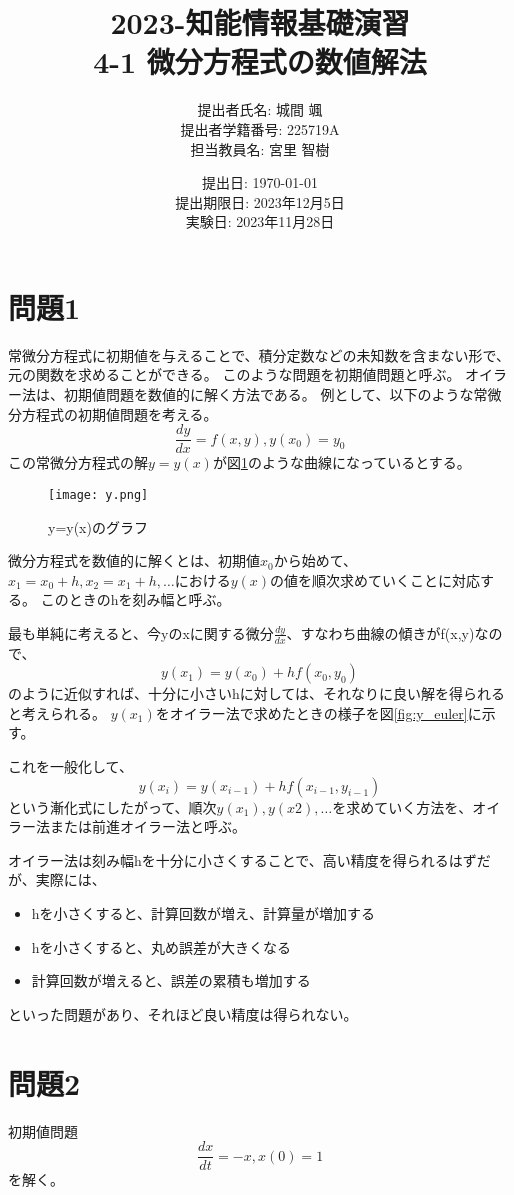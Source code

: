 \documentclass[a4paper, 11pt, titlepage]{jsarticle}
\title{2023-知能情報基礎演習\\4-1 微分方程式の数値解法}
\date{提出日: \today\\提出期限日: 2023年12月5日\\実験日: 2023年11月28日}
\author{提出者氏名: 城間 颯\\提出者学籍番号: 225719A\\担当教員名: 宮里 智樹}
\begin{document}
\maketitle
\tableofcontents 
\clearpage 

\section{問題1}
常微分方程式に初期値を与えることで、積分定数などの未知数を含まない形で、元の関数を求めることができる。
このような問題を初期値問題と呼ぶ。
オイラー法は、初期値問題を数値的に解く方法である。
例として、以下のような常微分方程式の初期値問題を考える。
$$
\frac{dy}{dx} = f(x,y), y(x_0) = y_0
$$
この常微分方程式の解$y=y(x)$が図\ref{fig:y}のような曲線になっているとする。

\begin{figure}[H]
	\centering
	\texttt{[image: y.png]}
	\caption{y=y(x)のグラフ}
	\label{fig:y}
\end{figure}

微分方程式を数値的に解くとは、初期値$x_0$から始めて、$x_1=x_0+h, x_2=x_1+h, \dots$における$y(x)$の値を順次求めていくことに対応する。
このときのhを刻み幅と呼ぶ。

最も単純に考えると、今yのxに関する微分$\frac{dy}{dx}$、すなわち曲線の傾きがf(x,y)なので、
$$
y(x_1) = y(x_0) + hf(x_0,y_0)
$$
のように近似すれば、十分に小さいhに対しては、それなりに良い解を得られると考えられる。
$y(x_1)$をオイラー法で求めたときの様子を図\ref{fig:y_euler}に示す。

これを一般化して、
$$
y(x_i) = y(x_{i-1}) + hf(x_{i-1},y_{i-1})
$$
という漸化式にしたがって、順次$y(x_1), y(x2), \dots$を求めていく方法を、オイラー法または前進オイラー法と呼ぶ。

オイラー法は刻み幅hを十分に小さくすることで、高い精度を得られるはずだが、実際には、
\begin{itemize}
	\item hを小さくすると、計算回数が増え、計算量が増加する
	\item hを小さくすると、丸め誤差が大きくなる
	\item 計算回数が増えると、誤差の累積も増加する
\end{itemize}
といった問題があり、それほど良い精度は得られない。

\section{問題2}
初期値問題
$$
\frac{dx}{dt} = -x, x(0) = 1
$$
を解く。
\end{document}
